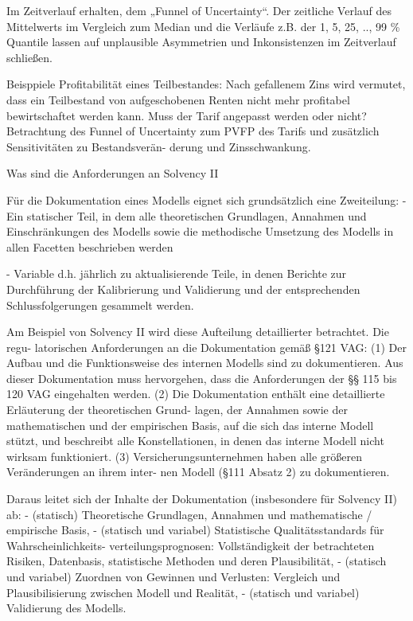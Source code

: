 Im Zeitverlauf erhalten, dem „Funnel of Uncertainty“. 
Der zeitliche Verlauf des Mittelwerts im Vergleich zum Median und die Verläufe z.B. der 1, 5, 25, .., 99 \% 
Quantile lassen auf unplausible Asymmetrien und Inkonsistenzen im Zeitverlauf schließen.

Beisppiele
Profitabilität eines Teilbestandes: Nach gefallenem Zins wird vermutet, dass
ein Teilbestand von aufgeschobenen Renten nicht mehr profitabel bewirtschaftet
werden kann. Muss der Tarif angepasst werden oder nicht? Betrachtung des Funnel
of Uncertainty zum PVFP des Tarifs und zusätzlich Sensitivitäten zu Bestandsverän-
derung und Zinsschwankung.


Was sind die Anforderungen an Solvency II

Für die Dokumentation eines Modells eignet sich grundsätzlich eine Zweiteilung:
- Ein statischer Teil, in dem alle theoretischen Grundlagen, Annahmen und Einschränkungen 
des Modells sowie die methodische Umsetzung des Modells in
allen Facetten beschrieben werden

- Variable d.h. jährlich zu aktualisierende Teile, in denen Berichte zur Durchführung 
der Kalibrierung und Validierung und der entsprechenden Schlussfolgerungen gesammelt werden.

Am Beispiel von Solvency II wird diese Aufteilung detaillierter betrachtet. Die regu-
latorischen Anforderungen an die Dokumentation gemäß §121 VAG:
(1) Der Aufbau und die Funktionsweise des internen Modells sind zu dokumentieren.
Aus dieser Dokumentation muss hervorgehen, dass die Anforderungen der §§ 115
bis 120 VAG eingehalten werden.
(2) Die Dokumentation enthält eine detaillierte Erläuterung der theoretischen Grund-
lagen, der Annahmen sowie der mathematischen und der empirischen Basis, auf
die sich das interne Modell stützt, und beschreibt alle Konstellationen, in denen das
interne Modell nicht wirksam funktioniert.
(3) Versicherungsunternehmen haben alle größeren Veränderungen an ihrem inter-
nen Modell (§111 Absatz 2) zu dokumentieren.

Daraus leitet sich der Inhalte der Dokumentation (insbesondere für Solvency II) ab:
- (statisch) Theoretische Grundlagen, Annahmen und mathematische / empirische Basis,
- (statisch und variabel) Statistische Qualitätsstandards für Wahrscheinlichkeits-
verteilungsprognosen: Vollständigkeit der betrachteten Risiken, Datenbasis,
statistische Methoden und deren Plausibilität,
- (statisch und variabel) Zuordnen von Gewinnen und Verlusten: Vergleich und
Plausibilisierung zwischen Modell und Realität,
- (statisch und variabel) Validierung des Modells.



